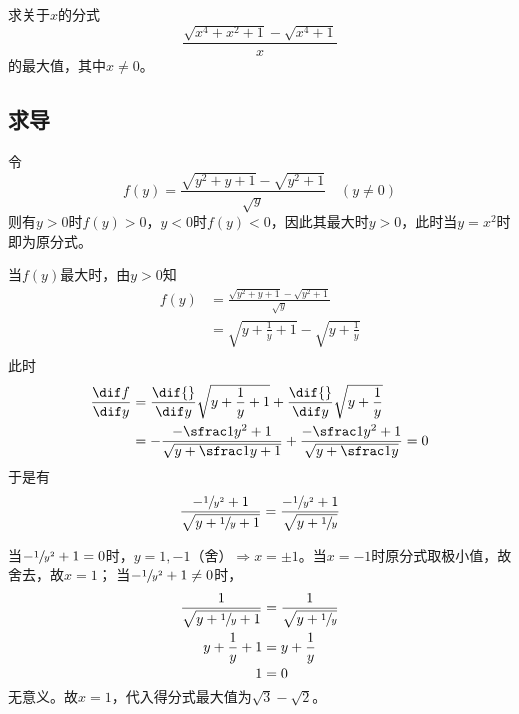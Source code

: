 

求关于$x$的分式
\[ \frac{\sqrt{x^4 + x^2 + 1} - \sqrt{x^4 + 1}}x \]
的最大值，其中$x \ne0$。


\subsection{求导}

令
\[ f(y) = \frac{\sqrt{y^2 + y + 1} - \sqrt{y^2 + 1}}{\sqrt y} \quad (y \ne0) \]
则有$y > 0$时$f(y) > 0$，$y < 0$时$f(y) < 0$，因此其最大时$y > 0$，此时当$y = x^2$时即为原分式。

当$f(y)$最大时，由$y > 0$知
\begin{align*}
  f(y) &= \frac{\sqrt{y^2 + y + 1} - \sqrt{y^2 + 1}}{\sqrt y} \\
  &= \sqrt{y + \frac1y + 1} - \sqrt{y + \frac1y} \\
\end{align*}
此时
\begin{align*}
  \frac{\dif f}{\dif y} &= \frac{\dif{}}{\dif y}\sqrt{y + \frac1y + 1} + \frac{\dif{}}{\dif y}\sqrt{y + \frac1y} \\
  &= -\frac{-\sfrac1{y^2} + 1}{\sqrt{y + \sfrac1y + 1}} + \frac{-\sfrac1{y^2} + 1}{\sqrt{y + \sfrac1y}} = 0 \\
\end{align*}
于是有
\[ \frac{-\sfrac1{y^2} + 1}{\sqrt{y + \sfrac1y + 1}} = \frac{-\sfrac1{y^2} + 1}{\sqrt{y + \sfrac1y}} \]

当$-\sfrac1{y^2} + 1 = 0$时，$y = 1, -1\text{（舍）} \Rightarrow x = \pm1$。当$x = -1$时原分式取极小值，故舍去，故$x = 1$；
当$-\sfrac1{y^2} + 1 \ne0$时，
\begin{align*}
  \frac1{\sqrt{y + \sfrac1y + 1}} &= \frac1{\sqrt{y + \sfrac1y}} \\
  y + \frac1y + 1 &= y + \frac1y \\
  1 &= 0 \\
\end{align*}
无意义。故$x = 1$，代入得分式最大值为$\sqrt3 - \sqrt2$。
